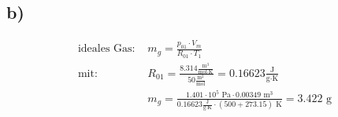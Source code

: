 

\subsection*{b)}
\begin{align*}
    \text{ideales Gas: } & m_g = \frac{p_{01} \cdot V_m}{R_{01} \cdot T_1} \\
    \text{mit: } & R_{01} = \frac{8.314 \frac{\text{m}^3}{\text{mol} \cdot \text{K}}}{50 \frac{\text{m}^2}{\text{mol}}} = 0.16623 \frac{\text{J}}{\text{g} \cdot \text{K}} \\
    & m_g = \frac{1.401 \cdot 10^5 \text{ Pa} \cdot 0.00349 \text{ m}^3}{0.16623 \frac{\text{J}}{\text{g} \cdot \text{K}} \cdot (500 + 273.15) \text{ K}} = 3.422 \text{ g}
\end{align*}